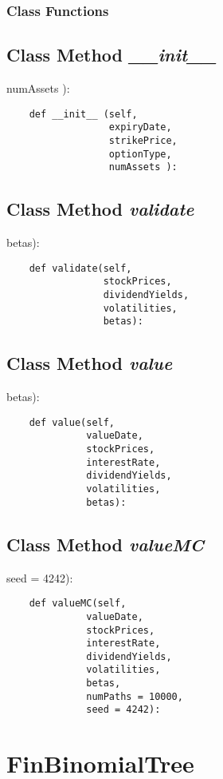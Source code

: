 \documentclass[twoside,11pt]{book}
\begin{document}
\subsubsection{Class Functions}

\subsection{Class Method {\it \_\_init\_\_ }}
numAssets ):

\begin{lstlisting}
    def __init__ (self,
                  expiryDate,
                  strikePrice,
                  optionType,
                  numAssets ):
\end{lstlisting}

\subsection{Class Method {\it validate}}
betas):

\begin{lstlisting}
    def validate(self, 
                 stockPrices,
                 dividendYields,
                 volatilities, 
                 betas):
\end{lstlisting}

\subsection{Class Method {\it value}}
betas):

\begin{lstlisting}
    def value(self,
              valueDate,
              stockPrices,
              interestRate,
              dividendYields,
              volatilities, 
              betas):
\end{lstlisting}

\subsection{Class Method {\it valueMC}}
seed = 4242):

\begin{lstlisting}
    def valueMC(self,
              valueDate,
              stockPrices,
              interestRate,
              dividendYields,
              volatilities,
              betas,
              numPaths = 10000,
              seed = 4242):
\end{lstlisting}

\newpage
\section{FinBinomialTree}
\end{document}
